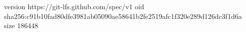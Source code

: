 version https://git-lfs.github.com/spec/v1
oid sha256:c91b10fad80dfe3981ab05090ae58641b2fe2519afc1f320e289d126dc3f1d6a
size 186448

